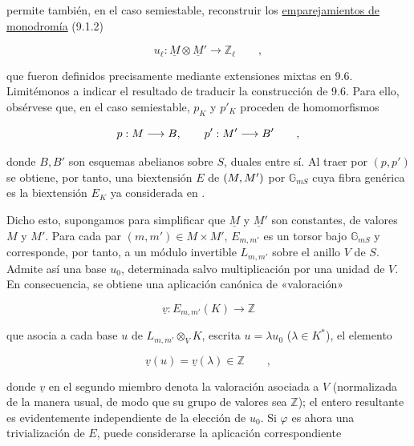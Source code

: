 \noindent
permite también, en el caso semiestable, reconstruir los
\underline{emparejamientos de monodromía} (9.1.2)

\begin{equation}\tag{14.2.4}
 u_\ell:\underline M\otimes\underline M'
 \longrightarrow\mathbb Z_\ell\qquad ,
\end{equation}

\noindent
que fueron definidos precisamente mediante extensiones mixtas en 9.6.
Limitémonos a indicar el resultado de traducir la construcción de 9.6.
Para ello, obsérvese que, en el caso semiestable, $p_K$ y $p'_K$
proceden de homomorfismos

\begin{equation*}
 p:\underline M\longrightarrow B,\qquad
 \sisi{\underline M'}{p':\underline M'}\longrightarrow B'\qquad ,
\end{equation*}

\noindent
donde $B,B'$ son esquemas abelianos sobre $S$, duales entre sí. Al
traer por $(p,p')$ se obtiene, por tanto, una biextensión $E$ de
$(\underline M,\sisi{M'}{\underline M'})$ por $\mathbb G_{mS}$ cuya
fibra genérica es la biextensión $E_K$ ya considerada en
.

Dicho esto, supongamos para simplificar que $\underline M$ y
$\underline M'$ son constantes, de valores $M$ y $M'$. Para cada par
$(m,m')\in M\times M'$, $E_{m,m'}$ es un torsor bajo
$\mathbb G_{mS}$ y corresponde, por tanto, a un módulo invertible
$L_{m,m'}$ sobre el anillo $V$ de $S$. Admite así una base $u_0$,
determinada salvo multiplicación por una unidad de $V$. En consecuencia,
se obtiene una aplicación canónica de «valoración»

\begin{equation*}
 \underline v:E_{m,m'}(K)\longrightarrow\mathbb Z
\end{equation*}

\noindent
que asocia a cada base $u$ de $L_{m,m'}\otimes_V K$, escrita
$u=\lambda u_0$ ($\lambda\in K^*$), el elemento

\begin{equation*}
 \underline v(u)=\underline v(\lambda)\in\mathbb Z\qquad ,
\end{equation*}

\noindent
donde $\underline v$ en el segundo miembro denota la valoración
asociada a $V$ (normalizada de la manera usual, de modo que su grupo de
valores sea $\mathbb Z$); el entero resultante es evidentemente
independiente de la elección de $u_0$. Si $\varphi$ es ahora una
trivialización de $E$, puede considerarse la aplicación correspondiente

